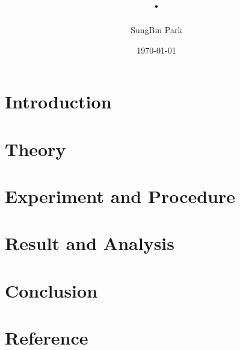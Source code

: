 \documentclass[aps,prl,twocolumn,groupedaddress]{revtex4-1}
\begin{document}
\title{.}
\author{SungBin Park}
\date{\today}

\begin{abstract}

\end{abstract}

\pacs{}
\maketitle

\section{Introduction}


\section{Theory}

\section{Experiment and Procedure}


\section{Result and Analysis}


\section{Conclusion}


\section{Reference}


\end{document}
